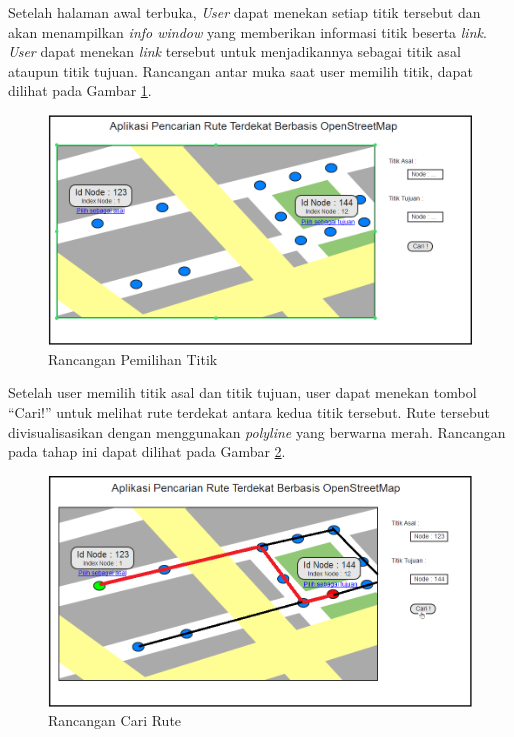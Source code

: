 Setelah halaman awal terbuka, \textit{User} dapat menekan setiap titik tersebut
dan akan menampilkan \textit{info window} yang memberikan informasi titik
beserta \textit{link}. \textit{User} dapat menekan \textit{link} tersebut untuk
menjadikannya sebagai titik asal ataupun titik tujuan. Rancangan antar muka saat
user memilih titik, dapat dilihat pada Gambar \ref{fig:mockup_2}.
\begin{figure}[h]
\centering
\includegraphics[scale=0.57]{Gambar/mockup_2}
\caption[Rancangan Pemilihan Titik]{Rancangan Pemilihan Titik}
\label{fig:mockup_2}
\end{figure}

Setelah user memilih titik asal dan titik tujuan, user dapat menekan tombol
``Cari!'' untuk melihat rute terdekat antara kedua titik tersebut. Rute tersebut
divisualisasikan dengan menggunakan \textit{polyline} yang berwarna merah.
Rancangan pada tahap ini dapat dilihat pada Gambar \ref{fig:mockup_3}.
\begin{figure}[h]
\centering
\includegraphics[scale=0.57]{Gambar/mockup_3}
\caption[Rancangan Cari Rute]{Rancangan Cari Rute}
\label{fig:mockup_3}
\end{figure}

